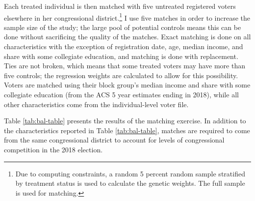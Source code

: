 \documentclass[
  12pt,
]{article}
\begin{document}
Each treated individual is then matched with five untreated registered voters elsewhere in her congressional district.\footnote{Due to computing constraints, a random 5 percent random sample stratified by treatment status is used to calculate the genetic weights. The full sample is used for matching.} I use five matches in order to increase the sample size of the study; the large pool of potential controls means this can be done without sacrificing the quality of the matches. Exact matching is done on all characteristics with the exception of registration date, age, median income, and share with some collegiate education, and matching is done with replacement. Ties are not broken, which means that some treated voters may have more than five controls; the regression weights are calculated to allow for this possibility. Voters are matched using their block group's median income and share with some collegiate education (from the ACS 5 year estimates ending in 2018), while all other characteristics come from the individual-level voter file.

Table \ref{tab:bal-table} presents the results of the matching exercise. In addition to the characteristics reported in Table \ref{tab:bal-table}, matches are required to come from the same congressional district to account for levels of congressional competition in the 2018 election.
\end{document}
